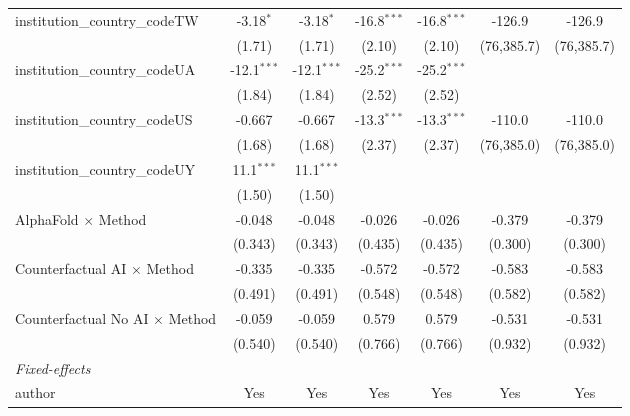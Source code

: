 \begin{tabular}{lcccccc}
   institution\_country\_codeTW          & -3.18$^{*}$   & -3.18$^{*}$   & -16.8$^{***}$ & -16.8$^{***}$ & -126.9       & -126.9\\   
                                         & (1.71)        & (1.71)        & (2.10)        & (2.10)        & (76,385.7)   & (76,385.7)\\   
   institution\_country\_codeUA          & -12.1$^{***}$ & -12.1$^{***}$ & -25.2$^{***}$ & -25.2$^{***}$ &              &   \\   
                                         & (1.84)        & (1.84)        & (2.52)        & (2.52)        &              &   \\   
   institution\_country\_codeUS          & -0.667        & -0.667        & -13.3$^{***}$ & -13.3$^{***}$ & -110.0       & -110.0\\   
                                         & (1.68)        & (1.68)        & (2.37)        & (2.37)        & (76,385.0)   & (76,385.0)\\   
   institution\_country\_codeUY          & 11.1$^{***}$  & 11.1$^{***}$  &               &               &              &   \\   
                                         & (1.50)        & (1.50)        &               &               &              &   \\   
   AlphaFold $\times$ Method             & -0.048        & -0.048        & -0.026        & -0.026        & -0.379       & -0.379\\   
                                         & (0.343)       & (0.343)       & (0.435)       & (0.435)       & (0.300)      & (0.300)\\   
   Counterfactual AI $\times$ Method     & -0.335        & -0.335        & -0.572        & -0.572        & -0.583       & -0.583\\   
                                         & (0.491)       & (0.491)       & (0.548)       & (0.548)       & (0.582)      & (0.582)\\   
   Counterfactual No AI $\times$ Method  & -0.059        & -0.059        & 0.579         & 0.579         & -0.531       & -0.531\\   
                                         & (0.540)       & (0.540)       & (0.766)       & (0.766)       & (0.932)      & (0.932)\\   
   \midrule
   \emph{Fixed-effects}\\
   author                                & Yes           & Yes           & Yes           & Yes           & Yes          & Yes\\  

\end{tabular}
